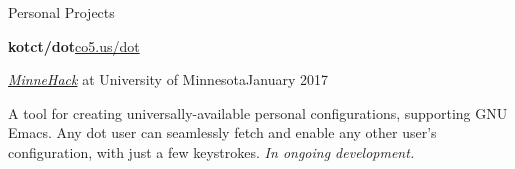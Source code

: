 \begin{minipage}[t]{0.665\textwidth}




  \vspace{10pt}

  {\sectionfont Personal Projects}

  \vspace{5pt}
  \textbf{kotct/dot}\hfill\href{https://github.com/kotct/dot/}{co5.us/dot}
  \begin{adjustwidth}{10pt}{}
    \emph{\href{https://minnehack.io/}{MinneHack}} at University of Minnesota\hfill January 2017

    A tool for creating universally-available personal configurations, supporting GNU Emacs.
    Any dot user can seamlessly fetch and enable any other user's configuration, with just a few keystrokes.
    \emph{In ongoing development.}
  \end{adjustwidth}




\end{minipage}

